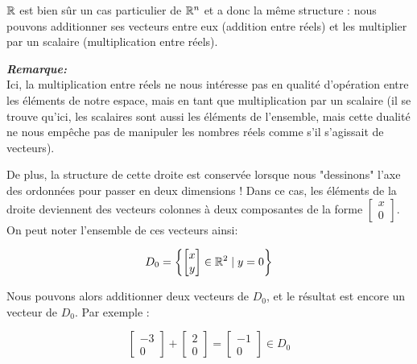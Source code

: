 $\mathbb{R}$ est bien sûr un cas particulier de $\mathbb{R}^n$ et a donc la même structure : nous pouvons additionner ses vecteurs entre eux (addition entre réels) et les multiplier par un scalaire (multiplication entre réels).

\textit{\textbf{Remarque:}} \\
Ici, la multiplication entre réels ne nous intéresse pas en qualité d'opération entre les éléments de notre espace, mais en tant que multiplication par un scalaire (il se trouve qu'ici, les scalaires sont aussi les éléments de l'ensemble, mais cette dualité ne nous empêche pas de manipuler les nombres réels comme s'il s'agissait de vecteurs).

De plus, la structure de cette droite est conservée lorsque nous "dessinons" l'axe des ordonnées pour passer en deux dimensions ! Dans ce cas, les éléments de la droite deviennent des vecteurs colonnes à deux composantes  de la forme $\begin{bmatrix}x\\0\end{bmatrix}$. On peut noter l'ensemble de ces vecteurs ainsi: 

\[
D_0 = \left\{\begin{bmatrix}x\\y\end{bmatrix} \in \mathbb{R}^2 \mid y = 0\right\}
\]

\begin{center}
\end{center}

Nous pouvons alors additionner deux vecteurs de $D_0$, et le résultat est encore un vecteur de $D_0$. Par exemple :

\[
\begin{bmatrix}-3\\0\end{bmatrix}
+ \begin{bmatrix}2\\0\end{bmatrix}
= \begin{bmatrix}-1\\0\end{bmatrix} \in D_0
\]


